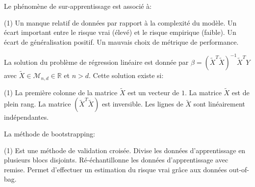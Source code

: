 \documentclass[solutions]{../cc}
\begin{document}
		\begin{question}
			Le phénomène de sur-apprentissage est associé à:
			\begin{tasks}(1)
				\task Un manque relatif de données par rapport à la complexité du modèle.
				\task Un écart important entre le risque vrai (élevé) et le risque empirique (faible).
				\task Un écart de généralisation positif.
				\task Un mauvais choix de métrique de performance.
			\end{tasks}
		\end{question}

		\begin{question}
			La solution du problème de régression linéaire est donnée par $\hat{\beta} = (\tilde{X}^T \tilde{X})^{-1} \tilde{X}^T Y$ avec $\tilde{X} \in \mathcal{M}_{n,d} \in \mathbb{R}$ et $n > d$. Cette solution existe si:
			\begin{tasks}(1)
				\task La première colonne de la matrice $\tilde{X}$ est un vecteur de $1$.
				\task La matrice $\tilde{X}$ est de plein rang.
				\task La matrice $(\tilde{X}^T \tilde{X})$ est inversible.
				\task Les lignes de $\tilde{X}$ sont linéairement indépendantes.
			\end{tasks}
		\end{question}

		\begin{question}
			La méthode de bootstrapping:
			\begin{tasks}(1)
				\task Est une méthode de validation croisée.
				\task Divise les données d'apprentissage en plusieurs blocs disjoints.
				\task Ré-échantillonne les données d'apprentissage avec remise.
				\task Permet d'effectuer un estimation du risque vrai grâce aux données out-of-bag.
			\end{tasks}
		\end{question}
\end{document}
